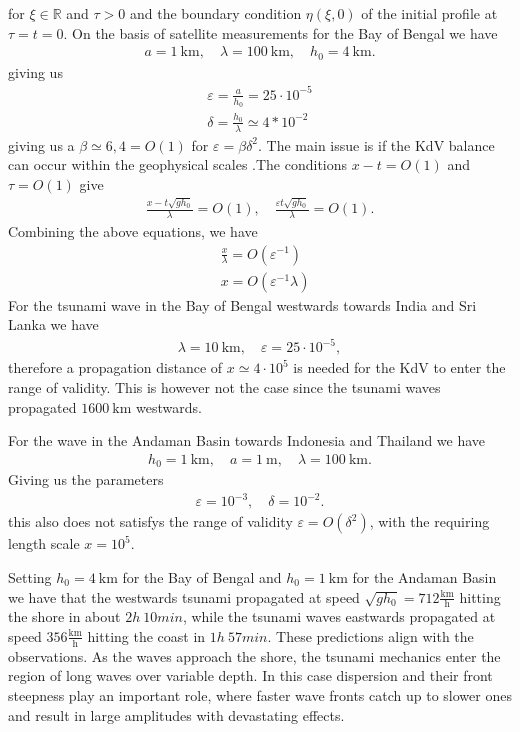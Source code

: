 for $\xi \in \mathbb{R}$ and $\tau > 0 $ and the boundary condition $\eta(\xi
,0)$ of the initial profile at $\tau = t = 0$. On the basis of satellite
measurements for the Bay of Bengal we have
\begin{align}
    a = 1\ \text{km}, \quad \lambda = 100\ \text{km},\quad h_0 = 4\
    \text{km}.
\end{align}
giving us
\begin{align}
    \varepsilon = \frac{a}{h_0} = 25 \cdot 10^{-5}\\
    \delta = \frac{h_0}{\lambda} \simeq 4*10^{-2}
\end{align}
giving us a $\beta \simeq 6,4 = O(1)$ for $\varepsilon = \beta \delta^2$.
The main issue is if the KdV balance can occur within the geophysical scales
.The conditions $x-t = O(1)$ and $\tau = O(1)$ give
\begin{align}
    \frac{x - t \sqrt{gh_0} }{\lambda} = O(1),\quad \frac{\varepsilon t
    \sqrt{gh_0} }{\lambda} = O(1).
\end{align}
Combining the above equations, we have
\begin{align}
   & \frac{x}{\lambda} = O(\varepsilon^{-1})\\
    &x  = O(\varepsilon^{-1}\lambda)
\end{align}
For the tsunami wave in the Bay of Bengal westwards towards India and Sri
Lanka we have
\begin{align}
    \lambda = 10\ \text{km}, \quad \varepsilon = 25 \cdot 10^{-5},
\end{align}
therefore a propagation distance of $x \simeq 4 \cdot 10^{5}$ is needed for
the KdV to enter the range of validity. This is however not the case since
the tsunami waves propagated $1600\ \text{km}$ westwards.

For the wave in the Andaman Basin towards Indonesia and Thailand we have
\begin{align}
    h_0 = 1\ \text{km}, \quad a = 1\ \text{m}, \quad \lambda = 100\
    \text{km}.
\end{align}
Giving us the parameters
\begin{align}
    \varepsilon  = 10^{-3}, \quad \delta = 10^{-2}.
\end{align}
this also does not satisfys the range of validity  $\varepsilon =
O(\delta^2)$, with the requiring length scale $x = 10^{5}$.

Setting $h_0 = 4\ \text{km}$ for the Bay of Bengal and $h_0 = 1\ \text{km}$
for the Andaman Basin we have that the westwards tsunami propagated at speed
$\sqrt{gh_0}  = 712 \frac{\text{km}}{\text{h}}$ hitting the shore in about
$2h\ 10min$, while the tsunami waves eastwards propagated at speed $356
\frac{\text{km}}{\text{h}}$ hitting the coast in $1h\ 57min$. These
predictions align with the observations. As the waves approach the shore, the
tsunami mechanics enter the region of long waves over variable depth. In this
case dispersion and their front steepness play an important role, where
faster wave fronts catch up to slower ones and result in large amplitudes
with devastating effects.

